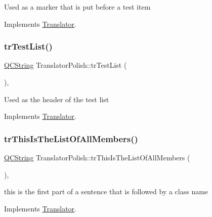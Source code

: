 Used as a marker that is put before a test item 

Implements \mbox{\hyperlink{class_translator}{Translator}}.

\mbox{\label{class_translator_polish_ab08b331b46f12531653bd2933328c57a}} 
\subsubsection{\texorpdfstring{trTestList()}{trTestList()}}
{\footnotesize\ttfamily \mbox{\hyperlink{class_q_c_string}{Q\+C\+String}} Translator\+Polish\+::tr\+Test\+List (\begin{DoxyParamCaption}{ }\end{DoxyParamCaption})\hspace{0.3cm}{\ttfamily [inline]}, {\ttfamily [virtual]}}

Used as the header of the test list 

Implements \mbox{\hyperlink{class_translator}{Translator}}.

\mbox{\label{class_translator_polish_a758732cefd26fb28599e42ca9af87b4e}} 
\subsubsection{\texorpdfstring{trThisIsTheListOfAllMembers()}{trThisIsTheListOfAllMembers()}}
{\footnotesize\ttfamily \mbox{\hyperlink{class_q_c_string}{Q\+C\+String}} Translator\+Polish\+::tr\+This\+Is\+The\+List\+Of\+All\+Members (\begin{DoxyParamCaption}{ }\end{DoxyParamCaption})\hspace{0.3cm}{\ttfamily [inline]}, {\ttfamily [virtual]}}

this is the first part of a sentence that is followed by a class name 

Implements \mbox{\hyperlink{class_translator}{Translator}}.

\mbox{\label{class_translator_polish_af9904849177fa7423fee813a81a8a581}} 
